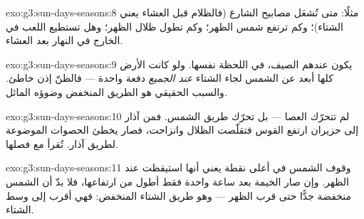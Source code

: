 \begin{solution}{exo:g3:sun-days-seasons:8}
مثلًا: متى تُشعَل مصابيح الشارع (فالظلام قبل العشاء يعني
الشتاء)؛ وكم ترتفع شمس الظهر؛ وكم تطول ظلال الظهر؛ وهل تستطيع
اللعب في الخارج في  النهار بعد العشاء.
\end{solution}

\begin{solution}{exo:g3:sun-days-seasons:9}
يكون عندهم الصيف، في اللحظة نفسها. ولو كانت الأرض كلها أبعد عن
الشمس لجاء الشتاء \emph{عند الجميع} دفعة واحدة --- فالظنّ إذن
خاطئ. والسبب الحقيقي هو الطريق المنخفض وضوؤه المائل.
\end{solution}

\begin{solution}{exo:g3:sun-days-seasons:10}
لم تتحرّك العصا --- بل تحرّك طريق الشمس. فمن آذار إلى حزيران
ارتفع القوس فتقلّصت الظلال وانزاحت، فصار  يخطئ الحصوات
الموضوعة لطريق آذار.  تُقرأ مع فصلها.
\end{solution}

\begin{solution}{exo:g3:sun-days-seasons:11}
وقوف الشمس في أعلى نقطة يعني أنها استيقظت عند الظهر. وإن صار 
الخيمة بعد ساعة واحدة فقط أطول من ارتفاعها، فلا بدّ أن الشمس
منخفضة جدًّا حتى قرب الظهر --- وهو طريق الشتاء المنخفض: فهي
أقرب إلى وسط الشتاء.
\end{solution}
